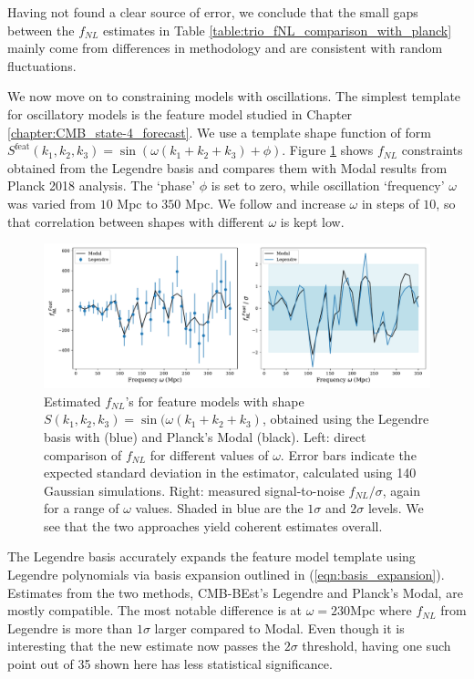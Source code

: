 Having not found a clear source of error, we conclude that the small gaps between the $f_{NL}$ estimates in Table \ref{table:trio_fNL_comparison_with_planck} mainly come from differences in methodology and are consistent with random fluctuations.

We now move on to constraining models with oscillations. The simplest template for oscillatory models is the feature model studied in Chapter \ref{chapter:CMB_state-4_forecast}. We use a template shape function of form $S^\text{feat}(k_1,k_2,k_3) = \sin(\omega (k_1 + k_2 + k_3) + \phi)$. Figure \ref{fig:sine_template_frequency_Legendre_Modal} shows $f_{NL}$ constraints obtained from the Legendre basis and compares them with Modal results from Planck 2018 analysis. The `phase' $\phi$ is set to zero, while oscillation `frequency' $\omega$ was varied from $10$ Mpc to $350$ Mpc. We follow \cite{Fergusson2015a} and increase $\omega$ in steps of $10$, so that correlation between shapes with different $\omega$ is kept low.

\begin{figure}[htbp!] 
	\centering    
	\includegraphics[width=\textwidth]{sine_template_frequency_Legendre_Modal.pdf}
	\caption{Estimated $f_{NL}$'s for feature models with shape $S(k_1,k_2,k_3) = \sin(\omega (k_1 + k_2 + k_3)$, obtained using the Legendre basis with (blue) and Planck's Modal (black). Left: direct comparison of $f_{NL}$ for different values of $\omega$. Error bars indicate the expected standard deviation in the estimator, calculated using 140 Gaussian simulations. Right: measured signal-to-noise $f_{NL}/\sigma$, again for a range of $\omega$ values. Shaded in blue are the $1\sigma$ and $2\sigma$ levels. We see that the two approaches yield coherent estimates overall.}
	\label{fig:sine_template_frequency_Legendre_Modal}
\end{figure}

The Legendre basis accurately expands the feature model template using Legendre polynomials via basis expansion outlined in (\ref{eqn:basis_expansion}). Estimates from the two methods, CMB-BEst's Legendre and Planck's Modal, are mostly compatible. The most notable difference is at $\omega=230$Mpc where $f_{NL}$ from Legendre is more than $1\sigma$ larger compared to Modal. Even though it is interesting that the new estimate now passes the $2\sigma$ threshold, having one such point out of 35 shown here has less statistical significance.

